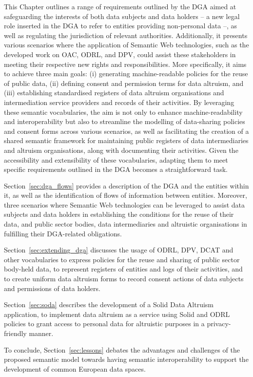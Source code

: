 This Chapter outlines a range of requirements outlined by the DGA aimed at safeguarding the interests of both data subjects and data holders -- a new legal role inserted in the DGA to refer to entities providing non-personal data --, as well as regulating the jurisdiction of relevant authorities. 
Additionally, it presents various scenarios where the application of Semantic Web technologies, such as the developed work on OAC, ODRL, and DPV, could assist these stakeholders in meeting their respective new rights and responsibilities.
More specifically, it aims to achieve three main goals: (i) generating machine-readable policies for the reuse of public data, (ii) defining consent and permission terms for data altruism, and (iii) establishing standardised registers of data altruism organisations and intermediation service providers and records of their activities.
By leveraging these semantic vocabularies, the aim is not only to enhance machine-readability and interoperability but also to streamline the modelling of data-sharing policies and consent forms across various scenarios, as well as facilitating the creation of a shared semantic framework for maintaining public registers of data intermediaries and altruism organisations, along with documenting their activities.
Given the accessibility and extensibility of these vocabularies, adapting them to meet specific requirements outlined in the DGA becomes a straightforward task.

Section~\ref{sec:dga_flows} provides a description of the DGA and the entities within it, as well as the identification of flows of information between entities.
Moreover, three scenarios where Semantic Web technologies can be leveraged to assist data subjects and data holders in establishing the conditions for the reuse of their data, and public sector bodies, data intermediaries and altruistic organisations in fulfilling their DGA-related obligations. 

Section~\ref{sec:extending_dga} discusses the usage of ODRL, DPV, DCAT and  other vocabularies to express policies for the reuse and sharing of public sector body-held data, to represent registers of entities and logs of their activities, and to create uniform data altruism forms to record consent actions of data subjects and permissions of data holders.

Section~\ref{sec:soda} describes the development of a Solid Data Altruism application, to implement data altruism as a service using Solid and ODRL policies to grant access to personal data for altruistic purposes in a privacy-friendly manner.

To conclude, Section~\ref{sec:lessons} debates the advantages and challenges of the proposed semantic model towards having semantic interoperability to support the development of common European data spaces.




